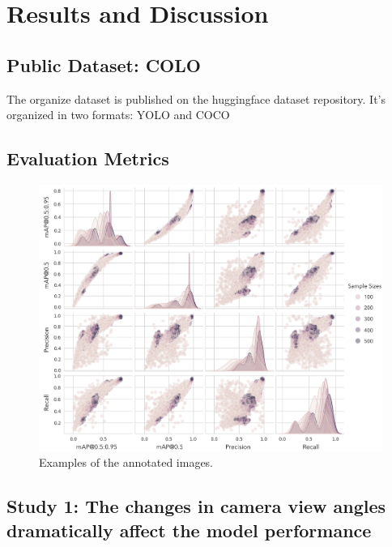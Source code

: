 \section{Results and Discussion}

\subsection*{Public Dataset: COLO}

The organize dataset is published on the huggingface dataset repository. It's organized in two formats: YOLO and COCO

\subsection*{Evaluation Metrics}


\begin{figure}[H]
    \centering
    \includegraphics[width=1\textwidth]{figure_s1.jpg}
    \caption{Examples of the annotated images.}
    \label{fig:metrics}
\end{figure}



\subsection*{Study 1: The changes in camera view angles dramatically affect the model performance}


